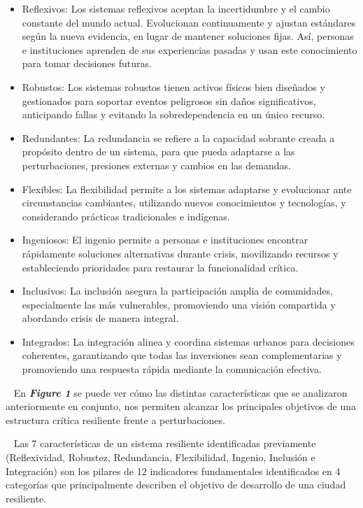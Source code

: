 \documentclass{article}
\begin{document}
\begin{itemize}
\item
  Reflexivos: Los sistemas reflexivos aceptan la incertidumbre y el
  cambio constante del mundo actual. Evolucionan continuamente y ajustan
  estándares según la nueva evidencia, en lugar de mantener soluciones
  fijas. Así, personas e instituciones aprenden de sus experiencias
  pasadas y usan este conocimiento para tomar decisiones futuras.
\item
  Robustos: Los sistemas robustos tienen activos físicos bien diseñados
  y gestionados para soportar eventos peligrosos sin daños
  significativos, anticipando fallas y evitando la sobredependencia en
  un único recurso.
\item
  Redundantes: La redundancia se refiere a la capacidad sobrante creada
  a propósito dentro de un sistema, para que pueda adaptarse a las
  perturbaciones, presiones externas y cambios en las demandas.
\item
  Flexibles: La flexibilidad permite a los sistemas adaptarse y
  evolucionar ante circunstancias cambiantes, utilizando nuevos
  conocimientos y tecnologías, y considerando prácticas tradicionales e
  indígenas.
\item
  Ingeniosos: El ingenio permite a personas e instituciones encontrar
  rápidamente soluciones alternativas durante crisis, movilizando
  recursos y estableciendo prioridades para restaurar la funcionalidad
  crítica.
\item
  Inclusivos: La inclusión asegura la participación amplia de
  comunidades, especialmente las más vulnerables, promoviendo una visión
  compartida y abordando crisis de manera integral.
\item
  Integrados: La integración alinea y coordina sistemas urbanos para
  decisiones coherentes, garantizando que todas las inversiones sean
  complementarias y promoviendo una respuesta rápida mediante la
  comunicación efectiva.
\end{itemize}

~ En \textbf{\emph{Figure 1}} se puede ver cómo las distintas
características que se analizaron anteriormente en conjunto, nos
permiten alcanzar los principales objetivos de una estructura crítica
resiliente frente a perturbaciones.

~ Las 7 características de un sistema resiliente identificadas
previamente (Reflexividad, Robustez, Redundancia, Flexibilidad, Ingenio,
Inclusión e Integración) son los pilares de 12 indicadores fundamentales
identificados en 4 categorías que principalmente describen el objetivo
de desarrollo de una ciudad resiliente.
\end{document}
